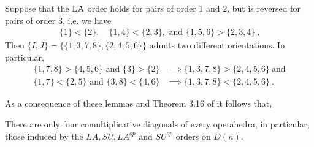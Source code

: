 \begin{example} \label{ex:Non-coherent order contradiction}
Suppose that the $\mathrm{LA}$ order holds for pairs of order $1$ and $2$, but is reversed for pairs of order $3$, i.e. we have 
\begin{align*}
    \{1\}<\{2\},\quad \{1,4\}< \{2,3\}, \text{ and } \{1, 5, 6 \} > \{2, 3, 4\} \ .
\end{align*}
Then $\{I,J\}=\{\{1, 3, 7, 8\}, \{2, 4, 5, 6\}\}$ admits two different orientations.
In particular, 
\begin{align*}
    \{1, 7, 8\} > \{ 4, 5, 6 \} \text{ and } \{3\} > \{2\} &\implies \{1, 3, 7, 8\} >\{2, 4, 5, 6\} \ \text{and} \\
    \{1, 7\}< \{2, 5\} \text{ and } \{3, 8\}< \{4, 6\} &\implies \{1, 3, 7, 8\} <\{2, 4, 5, 6\} \ .
\end{align*}
\end{example}


As a consequence of these lemmas and Theorem 3.16 of \cite{LA21} it follows that, 
\begin{thm}
There are only four comultiplicative diagonals of every operahedra, in particular, those induced by the $LA, SU, LA^{op}$ and $SU^{op}$ orders on $D(n)$.
\end{thm}

